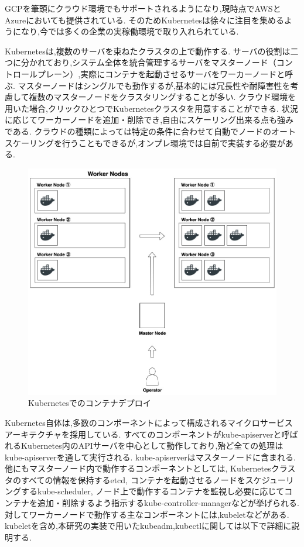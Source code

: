 GCPを筆頭にクラウド環境でもサポートされるようになり,現時点でAWSとAzureにおいても提供されている.
そのためKubernetesは徐々に注目を集めるようになり,今では多くの企業の実稼働環境で取り入れられている.

Kubernetesは,複数のサーバを束ねたクラスタの上で動作する.
サーバの役割は二つに分かれており,システム全体を統合管理するサーバをマスターノード（コントロールプレーン）,実際にコンテナを起動させるサーバをワーカーノードと呼ぶ.
マスターノードはシングルでも動作するが,基本的には冗長性や耐障害性を考慮して複数のマスターノードをクラスタリングすることが多い.
クラウド環境を用いた場合,クリックひとつでKubernetesクラスタを用意することができる.
状況に応じてワーカーノードを追加・削除でき,自由にスケーリング出来る点も強みである.
クラウドの種類によっては特定の条件に合わせて自動でノードのオートスケーリングを行うこともできるが,オンプレ環境では自前で実装する必要がある.

\begin{figure}[htbp]
\begin{center}
    \includegraphics[width=\textwidth]{./figures/k8s-deploy-container.jpg}
    \caption{Kubernetesでのコンテナデプロイ}
\end{center}
\end{figure}

Kubernetes自体は,多数のコンポーネントによって構成されるマイクロサービスアーキテクチャを採用している.
すべてのコンポーネントがkube-apiserverと呼ばれるKubernetes内のAPIサーバを中心として動作しており,殆ど全ての処理はkube-apiserverを通して実行される.
kube-apiserverはマスターノードに含まれる.
他にもマスターノード内で動作するコンポーネントとしては,
Kubernetesクラスタのすべての情報を保持するetcd,
コンテナを起動させるノードをスケジューリングするkube-scheduler,
ノード上で動作するコンテナを監視し必要に応じてコンテナを追加・削除するよう指示するkube-controller-managerなどが挙げられる.
対してワーカーノードで動作する主なコンポーネントには,kubeletなどがある.
kubeletを含め,本研究の実装で用いたkubeadm,kubectlに関しては以下で詳細に説明する.

